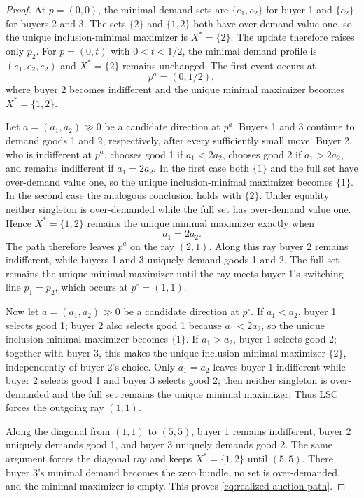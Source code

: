 \documentclass[11pt,a4paper,fleqn]{article}
\theoremstyle{plain}
\theoremstyle{definition}
\begin{document}
\begin{proof}
At $p=(0,0)$, the minimal demand sets are $\{e_1,e_2\}$ for buyer 1 and $\{e_2\}$ for buyers 2 and 3. The sets $\{2\}$ and $\{1,2\}$ both have over-demand value one, so the unique inclusion-minimal maximizer is $X^*=\{2\}$. The update therefore raises only $p_2$. For $p=(0,t)$ with $0<t<1/2$, the minimal demand profile is $(e_1,e_2,e_2)$ and $X^*=\{2\}$ remains unchanged. The first event occurs at
\[
p^a=(0,1/2),
\]
where buyer 2 becomes indifferent and the unique minimal maximizer becomes $X^*=\{1,2\}$.

Let $a=(a_1,a_2)\gg0$ be a candidate direction at $p^a$. Buyers 1 and 3 continue to demand goods 1 and 2, respectively, after every sufficiently small move. Buyer 2, who is indifferent at $p^a$, chooses good 1 if $a_1<2a_2$, chooses good 2 if $a_1>2a_2$, and remains indifferent if $a_1=2a_2$. In the first case both $\{1\}$ and the full set have over-demand value one, so the unique inclusion-minimal maximizer becomes $\{1\}$. In the second case the analogous conclusion holds with $\{2\}$. Under equality neither singleton is over-demanded while the full set has over-demand value one. Hence $X^*=\{1,2\}$ remains the unique minimal maximizer exactly when
\[
a_1=2a_2.
\]
The path therefore leaves $p^a$ on the ray $(2,1)$. Along this ray buyer 2 remains indifferent, while buyers 1 and 3 uniquely demand goods 1 and 2. The full set remains the unique minimal maximizer until the ray meets buyer 1's switching line $p_1=p_2$, which occurs at $p^\circ=(1,1)$.

Now let $a=(a_1,a_2)\gg0$ be a candidate direction at $p^\circ$. If $a_1<a_2$, buyer 1 selects good 1; buyer 2 also selects good 1 because $a_1<2a_2$, so the unique inclusion-minimal maximizer becomes $\{1\}$. If $a_1>a_2$, buyer 1 selects good 2; together with buyer 3, this makes the unique inclusion-minimal maximizer $\{2\}$, independently of buyer 2's choice. Only $a_1=a_2$ leaves buyer 1 indifferent while buyer 2 selects good 1 and buyer 3 selects good 2; then neither singleton is over-demanded and the full set remains the unique minimal maximizer. Thus LSC forces the outgoing ray $(1,1)$.

Along the diagonal from $(1,1)$ to $(5,5)$, buyer 1 remains indifferent, buyer 2 uniquely demands good 1, and buyer 3 uniquely demands good 2. The same argument forces the diagonal ray and keeps $X^*=\{1,2\}$ until $(5,5)$. There buyer 3's minimal demand becomes the zero bundle, no set is over-demanded, and the minimal maximizer is empty. This proves \eqref{eq:realized-auction-path}.
\end{proof}
\end{document}
